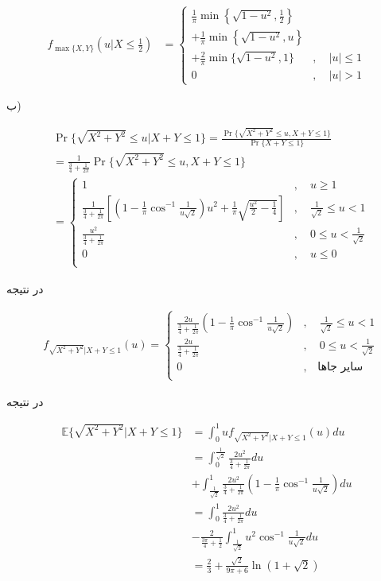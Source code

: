 \documentclass{article}
\newcommand{\eqn}[1]{
\begin{equation}\begin{split}
#1
\end{split}\end{equation}
}
\begin{document}
\eqn{
f_{\max\{X,Y\}}(u|X\le \frac{1}{2})
&=
\begin{cases}
\frac{1}{\pi}\min\left\{\sqrt{1-u^2},\frac{1}{2}\right\}\\+
\frac{1}{\pi}\min\left\{\sqrt{1-u^2},u\right\}\\+
\frac{2}{\pi}\min\{\sqrt{1-u^2},1\}&,\quad |u|\le 1\\
0&,\quad |u|>1
\end{cases}
}

ب)

\eqn{
&\Pr\{\sqrt{X^2+Y^2}\le u|X+Y\le 1\}=
\frac{\Pr\{\sqrt{X^2+Y^2}\le u,X+Y\le 1\}}{\Pr\{X+Y\le 1\}}
\\&=
\frac{1}{\frac{3}{4}+\frac{1}{2\pi}}
\Pr\{\sqrt{X^2+Y^2}\le u,X+Y\le 1\}
\\&=
\begin{cases}
1&,\quad u\ge 1\\
\frac{1}{\frac{3}{4}+\frac{1}{2\pi}}
\left[(1-\frac{1}{\pi}\cos^{-1}\frac{1}{u\sqrt 2})u^2+\frac{1}{\pi}\sqrt{\frac{u^2}{2}-\frac{1}{4}}\right]&,\quad \frac{1}{\sqrt 2}\le u< 1\\
\frac{u^2}{\frac{3}{4}+\frac{1}{2\pi}}&,\quad 0\le u< \frac{1}{\sqrt 2}\\
0&,\quad u\le 0\\
\end{cases}
}
در نتیجه
\eqn{
&f_{\sqrt{X^2+Y^2}|X+Y\le 1}(u)=
\begin{cases}
\frac{2u}{\frac{3}{4}+\frac{1}{2\pi}}
(1-\frac{1}{\pi}\cos^{-1}\frac{1}{u\sqrt 2})&,\quad \frac{1}{\sqrt 2}\le u< 1\\
\frac{2u}{\frac{3}{4}+\frac{1}{2\pi}}&,\quad 0\le u< \frac{1}{\sqrt 2}\\
0&,\quad \text{سایر جاها}\\
\end{cases}
}
در نتیجه
\eqn{
\mathbb{E}\{\sqrt{X^2+Y^2}|X+Y\le 1\}
&=\int_0^1 uf_{\sqrt{X^2+Y^2}|X+Y\le 1}(u)du
\\&=
\int_0^{\frac{1}{\sqrt2}} \frac{2u^2}{\frac{3}{4}+\frac{1}{2\pi}}du
\\&+
\int_{\frac{1}{\sqrt2}}^1 \frac{2u^2}{\frac{3}{4}+\frac{1}{2\pi}}
(1-\frac{1}{\pi}\cos^{-1}\frac{1}{u\sqrt 2})du
\\&=
\int_0^1 \frac{2u^2}{\frac{3}{4}+\frac{1}{2\pi}}du
\\&-
\frac{2}{\frac{3\pi}{4}+\frac{1}{2}}\int_{\frac{1}{\sqrt2}}^1 u^2\cos^{-1}\frac{1}{u\sqrt 2}du
\\&=
\frac{2}{3}+\frac{\sqrt2}{9\pi+6}\ln(1+\sqrt 2)
}
%
%
%
\end{document}
